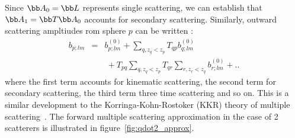 Since $\bb A_0=\bb L$ represents single scattering, we can establish that
$\bb A_1=\bb T\bb A_0$ accounts for secondary scattering.
Similarly, outward scattering ampltiudes rom sphere $p$ can be written :
%
\begin{eqnarray}
  b_{p;lm} &=&
      b_{p;lm}^{(0)} + \sum_{q,z_q<z_p}T_{qp}b_{q;lm}^{(0)}  \label{eq:multiple_scattering}\\
    &&~+T_{pq}\sum_{q,z_q<z_p}T_{qr}\sum_{r,z_r<z_q}b_{r;lm}^{(0)} + ..\nonumber
\end{eqnarray}
%
where the first term accounts for kinematic scattering, the second term for
secondary scattering, the third term three time scattering and so on.
This is a similar development to the Korringa-Kohn-Rostoker (KKR) theory of
multiple scattering~\cite{Korringa1947,Kohn1954,Korringa1994}.
The forward multiple scattering approximation in the case of 2 scatterers
is illustrated in figure~\ref{fig:qdot2_approx}.






